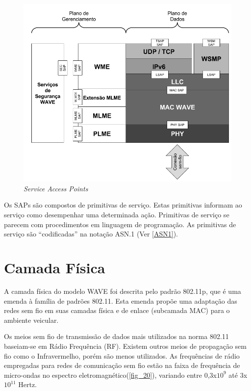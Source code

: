 \documentclass[
12pt,				%
openright,			%
oneside,			%
a4paper,			%
brazil,				%
]{abntex2}
\begin{document}
	\begin{figure} [H]
		\centering
		\includegraphics[scale=.5]{figuras/cap3/19ServiceAccessPoints}
		\caption{\label{fig_19}\textit{Service Access Points}}
	\end{figure}

	\par Os SAPs são compostos de primitivas de serviço. Estas primitivas informam ao serviço como desempenhar uma determinada ação. Primitivas de serviço se parecem com procedimentos em linguagem de programação. As primitivas de serviço são “codificadas” na notação ASN.1 (Ver \autoref{ASN1}).

	\section{Camada Física}

	\par A camada física do modelo WAVE foi descrita pelo padrão 802.11p, que é uma emenda à família de padrões 802.11. Esta emenda propõe uma adaptação das redes sem fio em suas camadas física e de enlace (subcamada MAC) para o ambiente veicular.

	\par Os meios sem fio de transmissão de dados mais utilizados na norma 802.11 baseiam-se em Rádio Frequência (RF).  Existem outros meios de propagação sem fio como o Infravermelho, porém são menos utilizados. As frequências de rádio empregadas para redes de comunicação sem fio estão na faixa de frequência de micro-ondas no espectro eletromagnético(\autoref{fig_20}), variando entre 0,3x$10^{9}$ até 3x$10^{11}$ Hertz.
\end{document}
